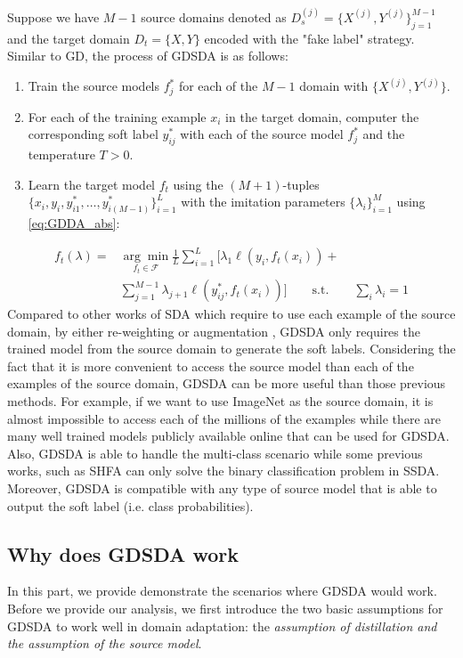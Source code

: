 Suppose we have $M-1$ source domains denoted as $D_s^{(j)}=\{X^{(j)},Y^{(j)}\}_{j=1}^{M-1}$ and the target domain $D_t=\{X,Y\}$ encoded with the "fake label" strategy. Similar to GD, the process of GDSDA is as follows:
\begin{enumerate}
    \item Train the source models $f^*_j$ for each of the $M-1$ domain with $\{X^{(j)},Y^{(j)}\}$.
    \item For each of the training example $x_i$ in the target domain, computer the corresponding soft label $y^*_{ij}$ with each of the source model $f^*_j$ and the temperature $T>0$.
    \item Learn the target model $f_t$ using the $(M+1)$-tuples $\{x_i,y_i,y^*_{i1},\dots,y^*_{i(M-1)}\}_{i=1}^L$ with the imitation parameters $\{\lambda_i\}^M_{i=1}$ using \eqref{eq:GDDA_abs}:
\end{enumerate} 
\begin{equation}\label{eq:GDDA_abs}
\begin{aligned}
f_t(\lambda)=&\underset{f_t \in \mathcal{F}}{\arg \min}\frac{1}{L}\sum_{i=1}^{L}\bigg[\lambda_1\ell\left(y_i,f_t(x_i)\right)+\\&\sum_{j=1}^{M-1}\lambda_{j+1}\ell\left(y^*_{ij},f_t(x_i)\right)\bigg]\qquad
 \text{s.t.} \qquad \sum_i\lambda_i=1
\end{aligned}
\end{equation}
Compared to other works of SDA which require to use each example of the source domain, by either re-weighting \cite{Donahue_2013_CVPR,duan2012visual} or augmentation \cite{daume2010frustratingly}, GDSDA only requires the trained model from the source domain to generate the soft labels. Considering the fact that it is more convenient to access the source model than each of the examples of the source domain, GDSDA can be more useful than those previous methods. For example, if we want to use ImageNet \cite{imagenet_cvpr09} as the source domain, it is almost impossible to access each of the millions of the examples while there are many well trained models publicly available online that can be used for GDSDA. Also, GDSDA is able to handle the multi-class scenario while some previous works, such as SHFA\cite{duan2012learning} can only solve the binary classification problem in SSDA. Moreover, GDSDA is compatible with any type of source model that is able to output the soft label (i.e. class probabilities).

\subsection{Why does GDSDA work}
In this part, we provide demonstrate the scenarios where GDSDA would work. Before we provide our analysis, we first introduce the two basic assumptions for GDSDA to work well in domain adaptation: the \textit{assumption of distillation and the assumption of the source model}.

